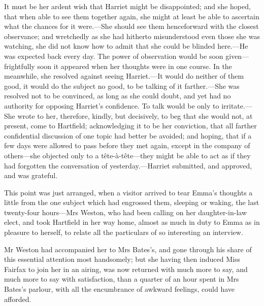 It must be her ardent wish that Harriet might be disappointed; and she hoped, that when able to see them together again, she might at least be able to ascertain what the chances for it were.—She should see them henceforward with the closest observance; and wretchedly as she had hitherto misunderstood even those she was watching, she did not know how to admit that she could be blinded here.—He was expected back every day. The power of observation would be soon given—frightfully soon it appeared when her thoughts were in one course. In the meanwhile, she resolved against seeing Harriet.—It would do neither of them good, it would do the subject no good, to be talking of it farther.—She was resolved not to be convinced, as long as she could doubt, and yet had no authority for opposing Harriet's confidence. To talk would be only to irritate.—She wrote to her, therefore, kindly, but decisively, to beg that she would not, at present, come to Hartfield; acknowledging it to be her conviction, that all farther confidential discussion of one topic had better be avoided; and hoping, that if a few days were allowed to pass before they met again, except in the company of others—she objected only to a tête-à-tête—they might be able to act as if they had forgotten the conversation of yesterday.—Harriet submitted, and approved, and was grateful.

This point was just arranged, when a visitor arrived to tear Emma's thoughts a little from the one subject which had engrossed them, sleeping or waking, the last twenty-four hours—Mrs Weston, who had been calling on her daughter-in-law elect, and took Hartfield in her way home, almost as much in duty to Emma as in pleasure to herself, to relate all the particulars of so interesting an interview.

Mr Weston had accompanied her to Mrs Bates's, and gone through his share of this essential attention most handsomely; but she having then induced Miss Fairfax to join her in an airing, was now returned with much more to say, and much more to say with satisfaction, than a quarter of an hour spent in Mrs Bates's parlour, with all the encumbrance of awkward feelings, could have afforded.

